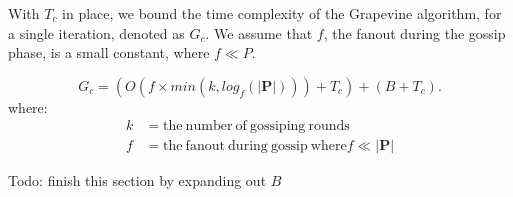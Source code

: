 With $T_c$ in place, we bound the time complexity of the \textsf{Grapevine}
algorithm, for a single iteration, denoted as $G_c$. We assume that $f$, the
fanout during the gossip phase, is a small constant, where $f \ll P$.

\[
G_c = (O(f\times min(k, log_f(\vert\mathbf{P}\vert))) + T_c) + (B + T_c).
\]
where:
\begin{align*}
 k     & =  \mathrm{the\ number\ of\ gossiping\ rounds} \\
 f     & =  \mathrm{the\ fanout\ during\ gossip\ where} f \ll \vert\mathbf{P}\vert
\end{align*}

%

Todo: finish this section by expanding out $B$

